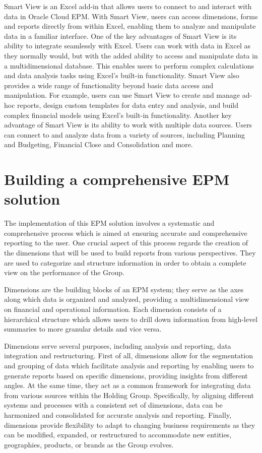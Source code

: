 \documentclass[12pt,a4paper,openright,twoside]{book}
\begin{document}
Smart View is an Excel add-in that allows users to connect to and interact with data in Oracle Cloud EPM. 
%
With Smart View, users can access dimensions, forms and reports directly from within Excel, enabling them to analyze and manipulate data in a familiar interface.
%
One of the key advantages of Smart View is its ability to integrate seamlessly with Excel. 
%
Users can work with data in Excel as they normally would, but with the added ability to access and manipulate data in a multidimensional database. 
%
This enables users to perform complex calculations and data analysis tasks using Excel's built-in functionality.
%
Smart View also provides a wide range of functionality beyond basic data access and manipulation. 
%
For example, users can use Smart View to create and manage ad-hoc reports, design custom templates for data entry and analysis, and build complex financial models using Excel's built-in functionality.
%
Another key advantage of Smart View is its ability to work with multiple data sources. 
%
Users can connect to and analyze data from a variety of sources, including Planning and Budgeting, Financial Close and Consolidation and more. 

\section{Building a comprehensive EPM solution}

The implementation of this EPM solution involves a systematic and comprehensive process which is aimed at ensuring accurate and comprehensive reporting to the user.
%
One crucial aspect of this process regards the creation of the dimensions that will be used to build reports from various perspectives. 
%
They are used to categorize and structure information in order to obtain a complete view on the performance of the Group.

Dimensions are the building blocks of an EPM system; they serve as the axes along which data is organized and analyzed, providing a multidimensional view on financial and operational information. 
%
Each dimension consists of a hierarchical structure which allows users to drill down information from high-level summaries to more granular details and vice versa.

Dimensions serve several purposes, including analysis and reporting, data integration and restructuring.
%
First of all, dimensions allow for the segmentation and grouping of data which facilitate analysis and reporting by enabling users to generate reports based on specific dimensions, providing insights from different angles.
%
At the same time, they act as a common framework for integrating data from various sources within the Holding Group. 
%
Specifically, by aligning different systems and processes with a consistent set of dimensions, data can be harmonized and consolidated for accurate analysis and reporting.
%
Finally, dimensions provide flexibility to adapt to changing business requirements as they can be modified, expanded, or restructured to accommodate new entities, geographies, products, or brands as the Group evolves.
\end{document}
